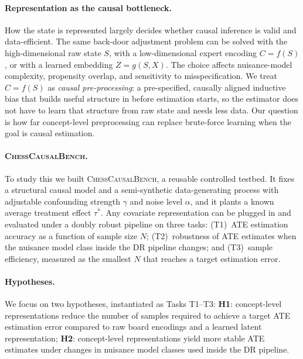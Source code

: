 \documentclass{article}
\begin{document}
\paragraph{Representation as the causal bottleneck.}
How the state is represented largely decides whether causal inference is valid
and data-efficient. The same back-door adjustment problem can be solved with the
high-dimensional raw state $S$, with a low-dimensional expert encoding $C=f(S)$,
or with a learned embedding $Z=g(S,X)$. The choice affects nuisance-model
complexity, propensity overlap, and sensitivity to misspecification. We treat
$C=f(S)$ as \emph{causal pre-processing}: a pre-specified, causally aligned
inductive bias that builds useful structure in before estimation starts, so the
estimator does not have to learn that structure from raw state and needs less
data.\cite{scholkopf2021towards,koh2020concept,fromCausalToConcept,kuang2020information}
Our question is how far concept-level preprocessing can replace brute-force
learning when the goal is causal estimation.

\paragraph{\textsc{ChessCausalBench}.}
To study this we built \textsc{ChessCausalBench}, a reusable controlled
testbed. It fixes a structural causal model and a semi-synthetic
data-generating process with adjustable confounding strength $\gamma$ and noise
level $\alpha$, and it plants a known average treatment effect $\tau^*$. Any
covariate representation can be plugged in and evaluated under a doubly robust
pipeline on three tasks: (T1)~ATE estimation accuracy as a function of sample
size $N$; (T2)~robustness of ATE estimates when the nuisance model class inside
the DR pipeline changes; and (T3)~sample efficiency, measured as the smallest
$N$ that reaches a target estimation
error.\cite{pearl2009causality,chernozhukov2018double}

\paragraph{Hypotheses.}
We focus on two hypotheses, instantiated as Tasks T1--T3:
\textbf{H1}: concept-level representations reduce the number of samples required
to achieve a target ATE estimation error compared to raw board encodings and a
learned latent representation;
\textbf{H2}: concept-level representations yield more stable ATE estimates under
changes in nuisance model classes used inside the DR pipeline.
\end{document}

